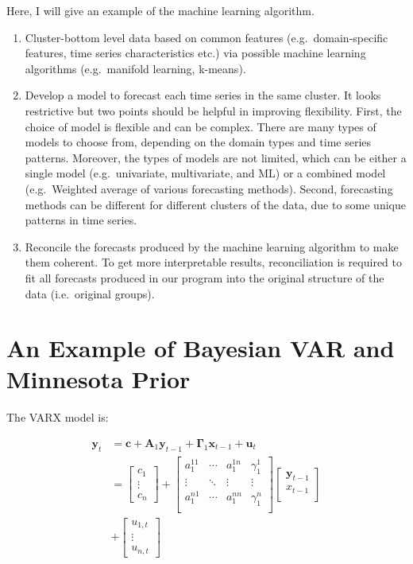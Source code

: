 \documentclass{monashthesis}
\begin{document}
Here, I will give an example of the machine learning algorithm.

\begin{enumerate}
\def\labelenumi{\arabic{enumi}.}
\item
  Cluster-bottom level data based on common features (e.g.~domain-specific features, time series characteristics etc.) via possible machine learning algorithms (e.g.~manifold learning, k-means).
\item
  Develop a model to forecast each time series in the same cluster. It looks restrictive but two points should be helpful in improving flexibility. First, the choice of model is flexible and can be complex. There are many types of models to choose from, depending on the domain types and time series patterns. Moreover, the types of models are not limited, which can be either a single model (e.g.~univariate, multivariate, and ML) or a combined model (e.g.~Weighted average of various forecasting methods). Second, forecasting methods can be different for different clusters of the data, due to some unique patterns in time series.
\item
  Reconcile the forecasts produced by the machine learning algorithm to make them coherent. To get more interpretable results, reconciliation is required to fit all forecasts produced in our program into the original structure of the data (i.e.~original groups).
\end{enumerate}

\appendix

\hypertarget{an-example-of-bayesian-var-and-minnesota-prior}{%
\chapter{An Example of Bayesian VAR and Minnesota Prior}\label{an-example-of-bayesian-var-and-minnesota-prior}}

The VARX model is:

\[
\begin{aligned}
\bm{y}_t&=\bm{c}+\bm{A}_1 \bm{y}_{t-1}+\bm{\Gamma}_1\bm{x}_{t-1}+\bm{u}_t\\
&=
\begin{bmatrix}
c_1\\
\vdots\\
c_n
\end{bmatrix}
+
\begin{bmatrix}
a_1^{11}&\cdots&a_1^{1n}&\gamma_1^{1}\\
\vdots&\ddots&\vdots&\vdots\\
a_1^{n1}&\cdots&a_1^{nn}&\gamma_1^n\\
\end{bmatrix}
\begin{bmatrix}
\bm{y}_{t-1}\\
x_{t-1}\\
\end{bmatrix}\\
&+
\begin{bmatrix}
u_{1,t}\\
\vdots\\
u_{n,t}
\end{bmatrix}\\
\end{aligned}
\]
\end{document}
